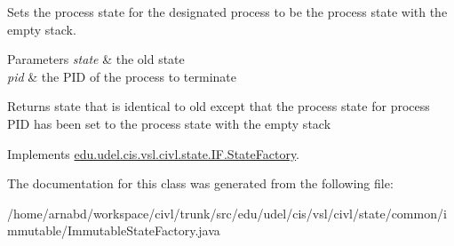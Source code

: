 Sets the process state for the designated process to be the process state with the empty stack. 


\begin{DoxyParams}{Parameters}
{\em state} & the old state \\
\hline
{\em pid} & the P\+I\+D of the process to terminate \\
\hline
\end{DoxyParams}
\begin{DoxyReturn}{Returns}
state that is identical to old except that the process state for process P\+I\+D has been set to the process state with the empty stack 
\end{DoxyReturn}


Implements \hyperlink{interfaceedu_1_1udel_1_1cis_1_1vsl_1_1civl_1_1state_1_1IF_1_1StateFactory_aefff2ccf75944f8eea5c77d95aeb3b5f}{edu.\+udel.\+cis.\+vsl.\+civl.\+state.\+I\+F.\+State\+Factory}.



The documentation for this class was generated from the following file\+:\begin{DoxyCompactItemize}
\item 
/home/arnabd/workspace/civl/trunk/src/edu/udel/cis/vsl/civl/state/common/immutable/Immutable\+State\+Factory.\+java\end{DoxyCompactItemize}
